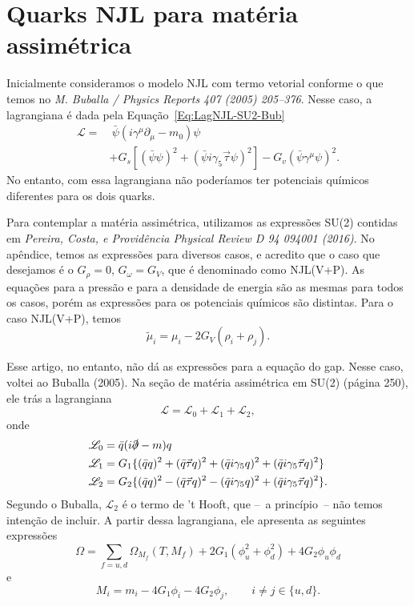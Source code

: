 \section{Quarks NJL para matéria assimétrica}

Inicialmente consideramos o modelo NJL com termo vetorial conforme o que temos no \emph{M. Buballa / Physics Reports 407 (2005) 205--376}. Nesse caso, a lagrangiana é dada pela Equação~\eqref{Eq:LagNJL-SU2-Bub}
\begin{equation*}
\begin{split}
	\mathscr{L} =&~ \bar{\psi}(i\gamma^\mu\partial_\mu - m_0)\psi \\
	&+ G_s[(\bar{\psi}\psi)^2 + (\bar{\psi}i\gamma_5\vec{\tau}\psi)^2] - G_v(\bar{\psi}\gamma^\mu \psi)^2.
\end{split}
\end{equation*}
%
No entanto, com essa lagrangiana não poderíamos ter potenciais químicos diferentes para os dois quarks.

Para contemplar a matéria assimétrica, utilizamos as expressões SU(2) contidas em \emph{Pereira, Costa, e Providência Physical Review D 94 094001 (2016)}. No apêndice, temos as expressões para diversos casos, e acredito que o caso que desejamos é o $G_\rho = 0$, $G_\omega = G_V$, que é denominado como NJL(V+P). As equações para a pressão e para a densidade de energia são as mesmas para todos os casos, porém as expressões para os potenciais químicos são distintas. Para o caso NJL(V+P), temos
\begin{equation}
    \tilde{\mu}_i = \mu_i - 2 G_V (\rho_i + \rho_j).
\end{equation}

Esse artigo, no entanto, não dá as expressões para a equação do gap. Nesse caso, voltei ao Buballa (2005). Na seção de matéria assimétrica em SU(2) (página 250), ele trás a lagrangiana
\begin{equation}
    \mathscr{L} = \mathscr{L}_0 + \mathscr{L}_1 + \mathscr{L}_2,
\end{equation}
%
onde
\begin{align}
    \mathscr{L}_0 &= \bar{q}(i\slashed{\partial} - m)q \\
    \mathscr{L}_1 &= G_1\{(\bar{q}q)^2 + (\bar{q}\vec{\tau}q)^2 + (\bar{q}i\gamma_5q)^2 + (\bar{q}i\gamma_5\vec{\tau}q)^2\} \\
    \mathscr{L}_2 &= G_2\{(\bar{q}q)^2 - (\bar{q}\vec{\tau}q)^2 - (\bar{q}i\gamma_5q)^2 + (\bar{q}i\gamma_5\vec{\tau}q)^2\}.
\end{align}
%
Segundo o Buballa, $\mathscr{L}_2$ é o termo de 't Hooft, que --~a princípio~-- não temos intenção de incluir. A partir dessa lagrangiana, ele apresenta as seguintes expressões
\begin{equation}
    \Omega = \sum_{f= u,d} \Omega_{M_f}(T, M_f) + 2 G_1(\phi^2_u + \phi_d^2) + 4 G_2\phi_u\phi_d
\end{equation}
%
e
\begin{equation}
    M_i = m_i - 4G_1\phi_i - 4G_2\phi_j, \qquad i \neq j \in \{u,d\}.
\end{equation}

